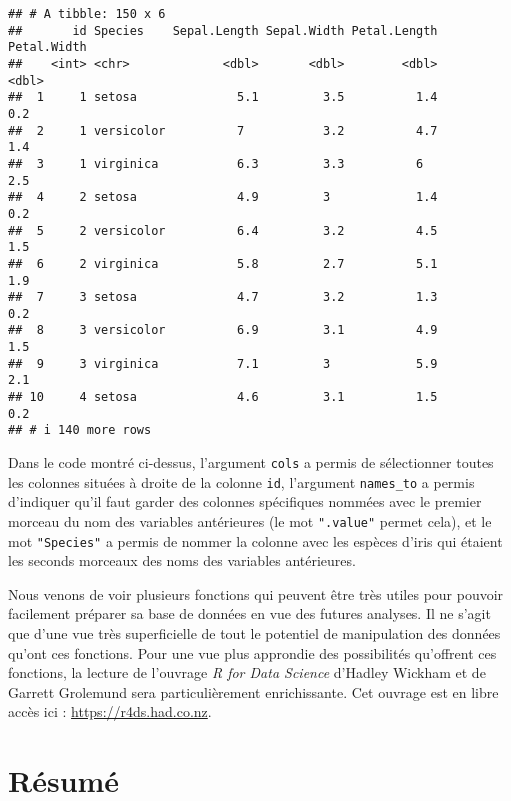 \documentclass[
]{book}
\begin{document}
\begin{verbatim}
## # A tibble: 150 x 6
##       id Species    Sepal.Length Sepal.Width Petal.Length Petal.Width
##    <int> <chr>             <dbl>       <dbl>        <dbl>       <dbl>
##  1     1 setosa              5.1         3.5          1.4         0.2
##  2     1 versicolor          7           3.2          4.7         1.4
##  3     1 virginica           6.3         3.3          6           2.5
##  4     2 setosa              4.9         3            1.4         0.2
##  5     2 versicolor          6.4         3.2          4.5         1.5
##  6     2 virginica           5.8         2.7          5.1         1.9
##  7     3 setosa              4.7         3.2          1.3         0.2
##  8     3 versicolor          6.9         3.1          4.9         1.5
##  9     3 virginica           7.1         3            5.9         2.1
## 10     4 setosa              4.6         3.1          1.5         0.2
## # i 140 more rows
\end{verbatim}

Dans le code montré ci-dessus, l'argument \texttt{cols} a permis de sélectionner toutes les colonnes situées à droite de la colonne \texttt{id}, l'argument \texttt{names\_to} a permis d'indiquer qu'il faut garder des colonnes spécifiques nommées avec le premier morceau du nom des variables antérieures (le mot \texttt{".value"} permet cela), et le mot \texttt{"Species"} a permis de nommer la colonne avec les espèces d'iris qui étaient les seconds morceaux des noms des variables antérieures.

Nous venons de voir plusieurs fonctions qui peuvent être très utiles pour pouvoir facilement préparer sa base de données en vue des futures analyses. Il ne s'agit que d'une vue très superficielle de tout le potentiel de manipulation des données qu'ont ces fonctions. Pour une vue plus approndie des possibilités qu'offrent ces fonctions, la lecture de l'ouvrage \emph{R for Data Science} d'Hadley Wickham et de Garrett Grolemund \autocite*{wickhamDataScience2017} sera particulièrement enrichissante. Cet ouvrage est en libre accès ici : \url{https://r4ds.had.co.nz}.

\hypertarget{ruxe9sumuxe9-1}{%
\section{Résumé}\label{ruxe9sumuxe9-1}}
\end{document}
